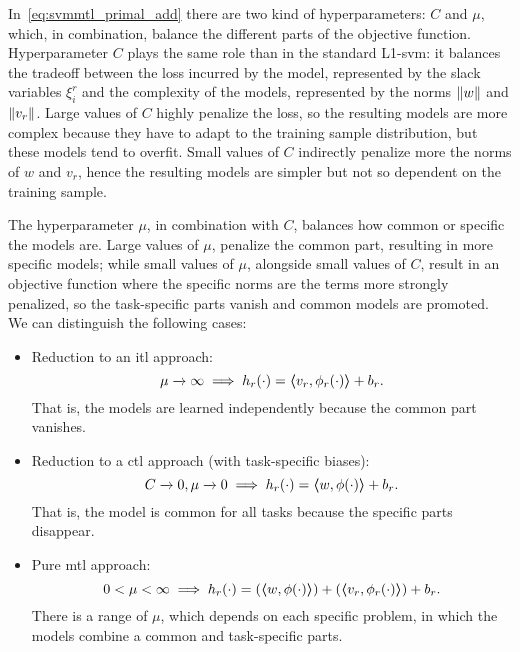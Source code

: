 %
In~\eqref{eq:svmmtl_primal_add} there are two kind of hyperparameters: $C$ and $\mu$, which, in combination, balance the different parts of the objective function. 
%
Hyperparameter $C$ plays the same role than in the standard L1-\acrshort{svm}: it balances the tradeoff between the loss incurred by the model, represented by the slack variables $\xi_i^r$ and the complexity of the models, represented by the norms $\left\lVert{w}\right\rVert$ and $\left\lVert{v}_r\right\rVert$. Large values of $C$ highly penalize the loss, so the resulting models are more complex because they have to adapt to the training sample distribution, but these models tend to overfit. Small values of $C$ indirectly penalize more the norms of $w$ and $v_r$, hence the resulting models are simpler but not so dependent on the training sample.

%
The hyperparameter $\mu$, in combination with $C$, balances how common or specific the models are. 
Large values of $\mu$, penalize the common part, resulting in more specific models; while small values of $\mu$, alongside small values of $C$, result in an objective function where the specific norms are the terms more strongly penalized, so the task-specific parts vanish and common models are promoted.
We can distinguish the following cases:
\begin{itemize}
    \item Reduction to an \acrshort{itl} approach:
    $$\mu \xrightarrow[]{} \infty \implies h_r(\cdot) = \bm{\left\langle} {v}_r, \phi_r(\cdot) \bm{\right\rangle} + b_r .$$
    That is, the models are learned independently because the common part vanishes.
    \item Reduction to a \acrshort{ctl} approach (with task-specific biases): 
    $$C \xrightarrow[]{} 0, \mu \xrightarrow[]{} 0 \implies h_r(\cdot) = \bm{\left\langle} w, \phi(\cdot) \bm{\right\rangle} + b_r .$$
    That is, the model is common for all tasks because the specific parts disappear.
    \item Pure \acrshort{mtl} approach:
    $$ 0 < \mu < \infty \implies h_r(\cdot) =(\bm{\left\langle} w, \phi(\cdot) \bm{\right\rangle} ) + (\bm{\left\langle} {v}_r, \phi_r(\cdot) \bm{\right\rangle}) + b_r .$$
    There is a range of $\mu$, which depends on each specific problem, in which the models combine a common and task-specific parts.
\end{itemize}

